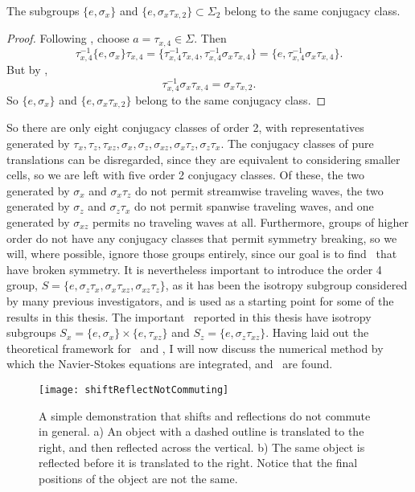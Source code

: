 \clearpage
\begin{theorem}
The subgroups $\{ e, \sigma_x\}$ and $\{e, \sigma_x\tau_{x,2}\} \subset \Sigma_2$ belong to the same conjugacy class.
\end{theorem}
\begin{proof}
Following , choose $a = \tau_{x,4} \in \Sigma$. Then
\begin{equation}
\tau_{x,4}^{-1}\{ e, \sigma_x\}\tau_{x,4} = \{ \tau_{x,4}^{-1}\tau_{x,4},\tau_{x,4}^{-1}\sigma_x\tau_{x,4}\} =\{e,\tau_{x,4}^{-1}\sigma_x\tau_{x,4}\} .
\end{equation}
But by ,
\begin{equation}
\tau_{x,4}^{-1}\sigma_x\tau_{x,4} = \sigma_x\tau_{x,2}.
\end{equation}
So $\{ e, \sigma_x\}$ and $\{e, \sigma_x\tau_{x,2}\}$ belong to the same conjugacy class.
\end{proof}

So there are only eight conjugacy classes of order 2, with representatives generated by $\tau_x,\tau_z,\tau_{xz}, \sigma_x,\sigma_z,\sigma_{xz},\sigma_{x}\tau_z,\sigma_z\tau_x$. The conjugacy classes of pure translations can be disregarded, since they are equivalent to considering smaller cells, so we are left with five order 2 conjugacy classes. Of these, the two  generated by $\sigma_x$ and $\sigma_x\tau_z$ do not permit streamwise traveling waves, the two generated by $\sigma_z$ and $\sigma_z\tau_x$ do not permit spanwise traveling waves, and one generated by  $\sigma_{xz}$ permits no traveling waves at all. Furthermore, groups of higher order do not have any conjugacy classes that permit symmetry breaking, so we will, where possible, ignore those groups entirely, since our goal is to find \ecs\ that have broken symmetry. It is nevertheless important to introduce the order 4 group, $S = \{ e, \sigma_z\tau_x,\sigma_x\tau_{xz},\sigma_{xz}\tau_z\}$, as it has been the isotropy subgroup considered by many previous investigators, and is used as a starting point for some of the results in this thesis. The important \ecs\ reported in this thesis have isotropy subgroups $S_x = \{ e, \sigma_x\} \times \{e,\tau_{xz}\}$ and $S_z = \{e, \sigma_z\tau_{xz}\}$. Having laid out the theoretical framework for \pCf\ and \ecs, I will now discuss the numerical method by which the Navier-Stokes equations are integrated, and \ecs\ are found.  
\begin{figure}[t!]
\texttt{[image: shiftReflectNotCommuting]}
\caption{A simple demonstration that shifts and reflections do not commute in general. a) An object with a dashed outline is translated to the right, and then reflected across the vertical. b) The same object is reflected before it is translated to the right. Notice that the final positions of the object are not the same.}\label{fig:notabelian}
\end{figure}

